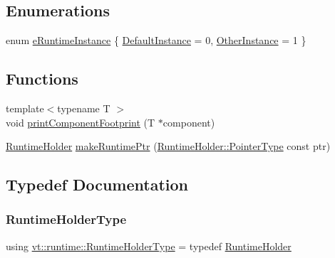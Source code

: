 \subsection*{Enumerations}
\begin{DoxyCompactItemize}
\item 
enum \hyperlink{namespacevt_1_1runtime_afca910c1b38b3975f7c1da8001a77d58}{e\+Runtime\+Instance} \{ \hyperlink{namespacevt_1_1runtime_afca910c1b38b3975f7c1da8001a77d58af4b803eff3cdc140ed473828f9c89101}{Default\+Instance} = 0, 
\hyperlink{namespacevt_1_1runtime_afca910c1b38b3975f7c1da8001a77d58af541bede5bc84a16357c26d30a508ff4}{Other\+Instance} = 1
 \}
\end{DoxyCompactItemize}
\subsection*{Functions}
\begin{DoxyCompactItemize}
\item 
{\footnotesize template$<$typename T $>$ }\\void \hyperlink{namespacevt_1_1runtime_aaaded5fb88c918140e08be1b0c1fd488}{print\+Component\+Footprint} (T $\ast$component)
\item 
\hyperlink{structvt_1_1runtime_1_1_runtime_holder}{Runtime\+Holder} \hyperlink{namespacevt_1_1runtime_a71998fecf2a4d70b11e3ae4aa47810db}{make\+Runtime\+Ptr} (\hyperlink{structvt_1_1runtime_1_1_runtime_holder_a9740e8aa7487fcf38b67a7e160d7b046}{Runtime\+Holder\+::\+Pointer\+Type} const ptr)
\end{DoxyCompactItemize}


\subsection{Typedef Documentation}
\mbox{\label{namespacevt_1_1runtime_ab09d044cce417fbcdb7e1e29b7aabbc3}} 
\subsubsection{\texorpdfstring{Runtime\+Holder\+Type}{RuntimeHolderType}}
{\footnotesize\ttfamily using \hyperlink{namespacevt_1_1runtime_ab09d044cce417fbcdb7e1e29b7aabbc3}{vt\+::runtime\+::\+Runtime\+Holder\+Type} = typedef \hyperlink{structvt_1_1runtime_1_1_runtime_holder}{Runtime\+Holder}}

